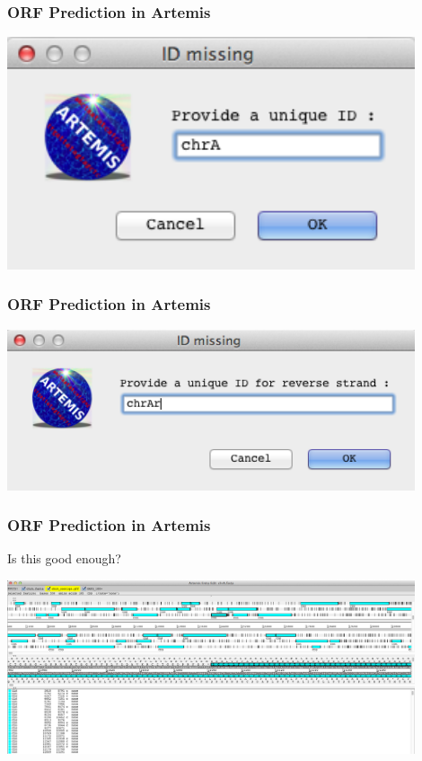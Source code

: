 \documentclass[table]{beamer}
\begin{document}
    \begin{frame}
      \frametitle{ORF Prediction in Artemis}    
      \begin{center}
        \includegraphics[width=0.9\textwidth]{images/artemis_orf2}     
      \end{center}
    \end{frame} 

    \begin{frame}
      \frametitle{ORF Prediction in Artemis}    
      \begin{center}
        \includegraphics[width=0.9\textwidth]{images/artemis_orf3}     
      \end{center}
    \end{frame} 

    \begin{frame}
      \frametitle{ORF Prediction in Artemis} 
      Is this good enough?
      \begin{center}
        \includegraphics[width=0.9\textwidth]{images/artemis_orf4}     
      \end{center}
    \end{frame} 
\end{document}
